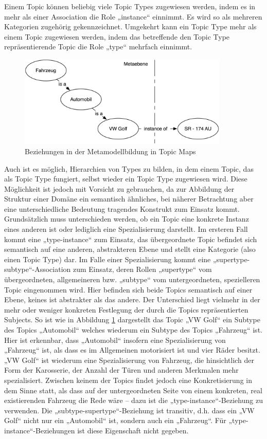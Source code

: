 Einem Topic können beliebig viele Topic Types zugewiesen werden, indem es in mehr als einer Association die Role „instance“ einnimmt. Es wird so als mehreren Kategorien zugehörig gekennzeichnet. Umgekehrt kann ein Topic Type mehr als einem Topic zugewiesen werden, indem das betreffende den Topic Type repräsentierende Topic die Role „type“ mehrfach einnimmt.

\begin{figure}[htbp]
	\centering
		\includegraphics[width=10cm]{img/Persistenz/MetaModelExample.png}
	\caption{Beziehungen in der Metamodellbildung in Topic Maps}
	\label{fig:img_Persistenz_MetaModelExample}
\end{figure}

Auch ist es möglich, Hierarchien von Types zu bilden, in dem einem Topic, das als Topic Type fungiert, selbst wieder ein Topic Type zugewiesen wird. Diese Möglichkeit ist jedoch mit Vorsicht zu gebrauchen, da zur Abbildung der Struktur einer Domäne ein semantisch ähnliches, bei näherer Betrachtung aber eine unterschiedliche Bedeutung tragendes Konstrukt zum Einsatz kommt. Grundsätzlich muss unterschieden werden, ob ein Topic eine konkrete Instanz eines anderen ist oder lediglich eine Spezialisierung darstellt. Im ersteren Fall kommt eine „type-instance“ zum Einsatz, das übergeordnete Topic befindet sich semantisch auf eine anderen, abstrakteren Ebene und stellt eine Kategorie (also einen Topic Type) dar. Im Falle einer Spezialisierung kommt eine „supertype-subtype“-Association zum Einsatz, deren Rollen „supertype“ vom übergeordneten, allgemeineren bzw. „subtype“ vom untergeordneten, spezielleren Topic eingenommen wird. Hier befinden sich beide Topics semantisch auf einer Ebene, keines ist abstrakter als das andere. Der Unterschied liegt vielmehr in der mehr oder weniger konkreten Festlegung der durch die Topics repräsentierten Subjects. So ist wie in Abbildung \ref{fig:img_Persistenz_MetaModelExample} dargestellt das Topic „VW Golf“ ein Subtype des Topics „Automobil“ welches wiederum ein Subtype des Topics „Fahrzeug“ ist. Hier ist erkennbar, dass „Automobil“ insofern eine Spezialisierung von „Fahrzeug“ ist, als dass es im Allgemeinen motorisiert ist und vier Räder besitzt. „VW Golf“ ist wiederum eine Spezialisierung von Fahrzeug, die hinsichtlich der Form der Karosserie, der Anzahl der Türen und anderen Merkmalen mehr spezialisiert. Zwischen keinem der Topics findet jedoch eine Konkretisierung in dem Sinne statt, als dass auf der untergeordneten Seite von einem konkreten, real existierenden Fahrzeug die Rede wäre -- dazu ist die „type-instance“-Beziehung zu verwenden. Die „subtype-supertype“-Beziehung ist transitiv, d.h. dass ein „VW Golf“ nicht nur ein „Automobil“ ist, sondern auch ein „Fahrzeug“. Für „type-instance“-Beziehungen ist diese Eigenschaft nicht gegeben. 

